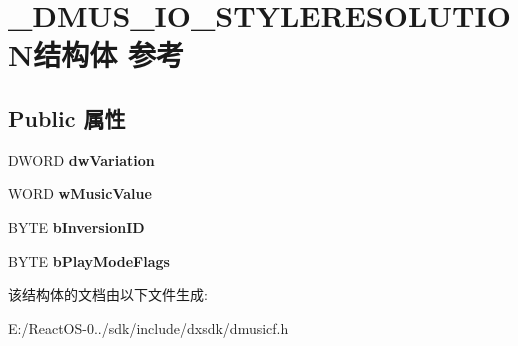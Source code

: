 \hypertarget{struct___d_m_u_s___i_o___s_t_y_l_e_r_e_s_o_l_u_t_i_o_n}{}\section{\+\_\+\+D\+M\+U\+S\+\_\+\+I\+O\+\_\+\+S\+T\+Y\+L\+E\+R\+E\+S\+O\+L\+U\+T\+I\+O\+N结构体 参考}
\label{struct___d_m_u_s___i_o___s_t_y_l_e_r_e_s_o_l_u_t_i_o_n}
\subsection*{Public 属性}
\begin{DoxyCompactItemize}
\item 
\mbox{\label{struct___d_m_u_s___i_o___s_t_y_l_e_r_e_s_o_l_u_t_i_o_n_acff85e97a5c86203022184ec85bc97b3}} 
D\+W\+O\+RD {\bfseries dw\+Variation}
\item 
\mbox{\label{struct___d_m_u_s___i_o___s_t_y_l_e_r_e_s_o_l_u_t_i_o_n_a16046a834ecacf0cd1508664a9d04b63}} 
W\+O\+RD {\bfseries w\+Music\+Value}
\item 
\mbox{\label{struct___d_m_u_s___i_o___s_t_y_l_e_r_e_s_o_l_u_t_i_o_n_ae3fc8a560d567b52a554f8b8f90c7bba}} 
B\+Y\+TE {\bfseries b\+Inversion\+ID}
\item 
\mbox{\label{struct___d_m_u_s___i_o___s_t_y_l_e_r_e_s_o_l_u_t_i_o_n_a2baa14b2fb216ba2ecc5c82a35620265}} 
B\+Y\+TE {\bfseries b\+Play\+Mode\+Flags}
\end{DoxyCompactItemize}


该结构体的文档由以下文件生成\+:\begin{DoxyCompactItemize}
\item 
E\+:/\+React\+O\+S-\/0../sdk/include/dxsdk/dmusicf.\+h\end{DoxyCompactItemize}

